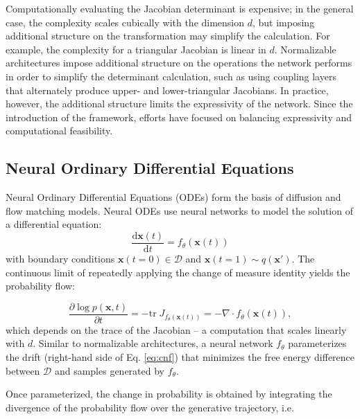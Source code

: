 \documentclass[%
 aip,
 amsmath,amssymb,
 reprint,%
]{revtex4-1}
\begin{document}
Computationally evaluating the Jacobian determinant is expensive; in the general case, the complexity scales cubically with the dimension $d$, but imposing additional structure on the transformation may simplify the calculation. For example, the complexity for a triangular Jacobian is linear in $d$. Normalizable architectures impose additional structure on the operations the network performs in order to simplify the determinant calculation, such as using coupling layers that alternately produce upper- and lower-triangular Jacobians\cite{RealNVP}. In practice, however, the additional structure limits the expressivity of the network. Since the introduction of the framework, efforts have focused on balancing expressivity and computational feasibility\cite{glow,neural-splines,masked-autoregressive-flows,stochastic-normalizing-flows}.

\subsection{Neural Ordinary Differential Equations}
\label{sec:neural-ode}
Neural Ordinary Differential Equations (ODEs) \cite{CNF} form the basis of diffusion and flow matching models. Neural ODEs use neural networks to model the solution of a differential equation:
\begin{equation}
    \label{eq:cnf}
    \frac{\mathrm{d}\mathbf{x}(t)}{\mathrm{d}t} = f_\theta(\mathbf{x}(t))
\end{equation}
with boundary conditions $\mathbf{x}(t=0) \in \mathcal{D}$ and $\mathbf{x}(t=1) \sim q(\mathbf{x}')$. The continuous limit of repeatedly applying the change of measure identity yields the probability flow:

\begin{equation}
    \label{eq:probability-flow}
    \frac{\partial \log p(\mathbf{x}, t)}{\partial t} = -\mathrm{tr}\;  J_{f_\theta(\mathbf{x}(t))} = - \nabla \cdot f_\theta(\mathbf{x}(t)),
\end{equation}
which depends on the trace of the Jacobian -- a computation that scales linearly with $d$. Similar to normalizable architectures, a neural network $f_\theta$ parameterizes the drift (right-hand side of Eq. \ref{eq:cnf}) that minimizes the free energy difference between $\mathcal{D}$ and samples generated by $f_\theta$. 

Once parameterized, the change in probability is obtained by integrating the divergence of the probability flow over the generative trajectory, i.e.
\end{document}
